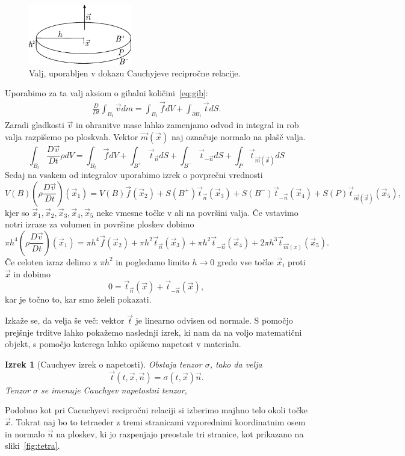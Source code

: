 \documentclass[12pt,a4paper]{article}
\theoremstyle{definition} %
\theoremstyle{plain} %
\newtheorem{izrek}[definicija]{Izrek}
\numberwithin{equation}{section}
\newcommand{\DD}[2]{\ensuremath{\frac{D #1}{D #2}}}
\newcommand{\DDt}[1]{\DD{#1}{t}}
\newcommand{\vv}{\vec{v}}
\newcommand{\vt}{\vec{t}}
\newcommand{\vn}{\vec{n}}
\newcommand{\vf}{\vec{f}}
\newcommand{\vm}{\vec{m}}
\newcommand{\vx}{\vec{x}}
\newcommand{\ts}{\sigma}
\begin{document}
\begin{figure}[h]
  \centering
  \includegraphics[width=0.4\textwidth]{images/cauchy_disc.pdf}
  \caption{Valj, uporabljen v dokazu Cauchyjeve recipročne relacije.}
  \label{fig:valj}
\end{figure}

Uporabimo za ta
valj aksiom o gibalni količini~\eqref{eq:gib}:
\begin{align*}
  \DDt{} \int_{B_t} \vv dm = \int_{B_t} \vf dV + \int_{\partial B_t} \vt dS.
\end{align*}
Zaradi gladkosti $\vv$ in ohranitve mase lahko zamenjamo odvod in integral in rob valja
razpišemo po ploskvah. Vektor $\vm(\vx)$ naj označuje normalo na plašč valja.
\[
  \int_{B_t} \DDt{\vv} \rho dV = \int_{B_t} \vf dV + \int_{B^+} \vt_{\vn} dS +
  \int_{B^-}\vt_{-\vn} dS + \int_{P} \vt_{\vm(\vx)}dS
\]
Sedaj na vsakem od integralov uporabimo izrek o povprečni vrednosti
\[
  V(B) (\rho\DDt{\vv})(\vx_1) = V(B) \vf(\vx_2) + S(B^+)\vt_{\vn}(\vx_3) +
  S(B^-)\vt_{-\vn}(\vx_4) + S(P)\vt_{\vm(\vx)}(\vx_5),
\]
kjer so $\vx_1, \vx_2, \vx_3, \vx_4, \vx_5$ neke vmesne točke v ali na površini valja.
Če vstavimo notri izraze za volumen in površine ploskev dobimo
\[
  \pi h^4 (\rho \DDt{\vv})(\vx_1) = \pi h^4 \vf(\vx_2) + \pi h^2 \vt_{\vn}(\vx_3) +
  \pi h^2 \vt_{-\vn}(\vx_4) + 2 \pi h^3 \vt_{\vm(x)}(\vx_5).
\]
Če celoten izraz delimo z $\pi h^2$ in pogledamo limito $h\to 0$ gredo vse točke
$\vx_i$ proti $\vx$ in dobimo
\[
  0 = \vt_{\vn}(\vx) + \vt_{-\vn}(\vx),
\]
kar je točno to, kar smo želeli pokazati.
\endproof

Izkaže se, da velja še več: vektor $\vt$ je linearno odvisen od normale. S
pomočjo prejšnje trditve lahko pokažemo naslednji izrek, ki nam da na voljo
matematični objekt, s pomočjo katerega lahko opišemo napetost v materialu.
\begin{izrek}[Cauchyev izrek o napetosti]
  Obstaja tenzor $\ts$, tako da velja \[
    \vt(t, \vx, \vn) = \ts(t, \vx)\vn.
  \]
  Tenzor $\ts$ se imenuje Cauchyev napetostni tenzor,
\end{izrek}
\proof
Podobno kot pri Cacuchyevi recipročni relaciji si izberimo majhno telo okoli
točke $\vx$. Tokrat naj bo to tetraeder z tremi stranicami vzporednimi
koordinatnim osem in normalo $\vn$ na ploskev, ki jo razpenjajo preostale tri
stranice, kot prikazano na sliki~\ref{fig:tetra}.
\end{document}
